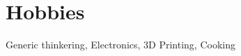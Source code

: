 \documentclass[letterpaper,11pt]{article}
\makeatletter
\newcommand{\resumeOrganizationHeading}[4]{
  \vspace{-2pt}\item
    \begin{tabular*}{0.97\textwidth}[t]{l@{\extracolsep{\fill}}r}
      \textbf{#1} & \textit{\small #2} \\
      \textit{\small#3}
    \end{tabular*}\vspace{-7pt}
}
\newcommand{\resumeSubHeadingListStart}{\begin{itemize}[leftmargin=0.15in, label={}]}
\newcommand{\resumeSubHeadingListEnd}{\end{itemize}}
\makeatother
\begin{document}













\section{Hobbies}
  \resumeSubHeadingListStart
    \small{\item{Generic thinkering, Electronics, 3D Printing, Cooking}}
  \resumeSubHeadingListEnd








\end{document}
